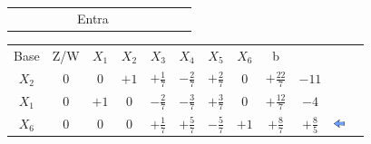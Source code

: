 \documentclass{beamer}
\begin{document}
\begin{frame}
{\begin{table}
\begin{tabular}{c c c c c c c c c c c c}
				& & & & & \scriptsize Entra \\
			\end{tabular}
		\end{table}			
	}	
	{
		\begin{table}		
			\begin{tabular}{c c c c c c c c c c c c}
				\cline{1-8} 
				\cellcolor{blue!100} \color{white} \scriptsize Base 
				&\cellcolor{blue!100} \color{white} \scriptsize Z/W
				&\cellcolor{blue!100} \color{red} $\scriptstyle X_1$ 
				&\cellcolor{blue!100} \color{red} $\scriptstyle X_2$ 
				&\cellcolor{blue!100} \color{white}   $\scriptstyle X_3$ 
				&\cellcolor{blue!100} \color{white} $\scriptstyle X_4$ 
				&\cellcolor{blue!100} \color{white}   $\scriptstyle X_5$ 
				&\cellcolor{blue!100} \color{red}   $\scriptstyle X_6$ 
				&\cellcolor{blue!100} \color{white} \scriptsize b
				&
				&
				& \\
				\cellcolor{blue!100} \color{red} $\scriptstyle X_2$
				& \cellcolor{yellow!50} $\scriptstyle 0$
				& \cellcolor{yellow!50} $\scriptstyle 0$
				& \cellcolor{yellow!50} $\scriptstyle +1$
				& \cellcolor{yellow!50} $\scriptstyle +\frac{1}{7}$
				& \cellcolor{gray!50} $\scriptstyle -\frac{2}{7}$
				& \cellcolor{yellow!50} $\scriptstyle +\frac{2}{7}$
				& \cellcolor{yellow!50} $\scriptstyle 0$
				& \cellcolor{yellow!50} $\scriptstyle +\frac{22}{7}$
				& $ \scriptstyle -11 $ \\
			    \cellcolor{blue!100} \color{red} $\scriptstyle X_1$
				& \cellcolor{yellow!50} $\scriptstyle 0$
				& \cellcolor{yellow!50} $\scriptstyle +1$
				& \cellcolor{yellow!50} $\scriptstyle 0$
				& \cellcolor{yellow!50} $\scriptstyle -\frac{2}{7}$			
				& \cellcolor{gray!50} $\scriptstyle -\frac{3}{7}$
				& \cellcolor{yellow!50} $\scriptstyle +\frac{3}{7}$
				& \cellcolor{yellow!50} $\scriptstyle 0$ 
				& \cellcolor{yellow!50} $\scriptstyle +\frac{12}{7}$
				& $ \scriptstyle -4 $  \\
				\cellcolor{blue!100} \color{red} $\scriptstyle X_6$
				& \cellcolor{yellow!50} $\scriptstyle 0$
				& \cellcolor{yellow!50} $\scriptstyle 0$
				& \cellcolor{yellow!50} $\scriptstyle 0$
				& \cellcolor{yellow!50} $\scriptstyle +\frac{1}{7}$
				& \cellcolor{gray!50} $\scriptstyle +\frac{5}{7}$
				& \cellcolor{yellow!50} $\scriptstyle -\frac{5}{7}$
				& \cellcolor{yellow!50} $\scriptstyle +1$
				& \cellcolor{yellow!50} $\scriptstyle +\frac{8}{7}$
				& $ \scriptstyle +\frac{8}{5} $ & \includegraphics[width=0.3cm,height=0.3cm]{setaesquerda.jpg}  \\

\end{tabular}
\end{table}}
\end{frame}
\end{document}
